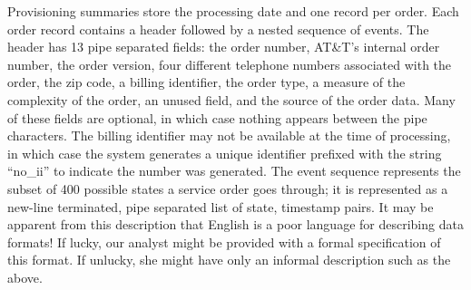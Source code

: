 Provisioning summaries store the processing date and one record per
order.  Each order record contains a header followed by a nested
sequence of events.  The header has 13 pipe separated fields: the
order number, AT\&T's internal order number, the order version, four
different telephone numbers associated with the order, the zip code, a
billing identifier, the order type, a measure of the complexity of the
order, an unused field, and the source of the order data.  Many of
these fields are optional, in which case nothing appears between the
pipe characters.  The billing identifier may not be available at the
time of processing, in which case the system generates a unique
identifier prefixed with the string ``no\_ii'' to indicate the number
was generated. The event sequence represents the subset of 400
possible states a service order goes through; it is represented as a
new-line terminated, pipe separated list of state, timestamp pairs.
It may be apparent from this description that English is a poor
language for describing data formats!  If lucky, our analyst might be
provided with a formal specification of this format.  If unlucky, she might have
only an informal description such as the above.


